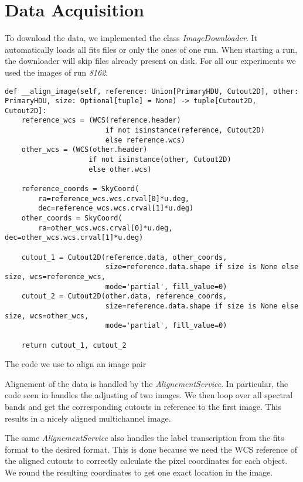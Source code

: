 \section{Data Acquisition}
To download the data, we implemented the class \emph{ImageDownloader}. It automatically loads all fits files or only the ones of one run. When starting a run, the downloader will skip files already present on disk.
For all our experiments we used the images of run \emph{8162}.

\begin{listing}
    \begin{verbatim}
def __align_image(self, reference: Union[PrimaryHDU, Cutout2D], other: PrimaryHDU, size: Optional[tuple] = None) -> tuple[Cutout2D, Cutout2D]:
    reference_wcs = (WCS(reference.header)
                        if not isinstance(reference, Cutout2D)
                        else reference.wcs)
    other_wcs = (WCS(other.header)
                    if not isinstance(other, Cutout2D)
                    else other.wcs)

    reference_coords = SkyCoord(
        ra=reference_wcs.wcs.crval[0]*u.deg,
        dec=reference_wcs.wcs.crval[1]*u.deg)
    other_coords = SkyCoord(
        ra=other_wcs.wcs.crval[0]*u.deg, dec=other_wcs.wcs.crval[1]*u.deg)

    cutout_1 = Cutout2D(reference.data, other_coords,
                        size=reference.data.shape if size is None else size, wcs=reference_wcs,
                        mode='partial', fill_value=0)
    cutout_2 = Cutout2D(other.data, reference_coords,
                        size=reference.data.shape if size is None else size, wcs=other_wcs,
                        mode='partial', fill_value=0)

    return cutout_1, cutout_2
        \end{verbatim}
    \label{alignementCode}
    \caption{The code we use to align an image pair}
\end{listing}

Alignement of the data is handled by the \emph{AlignementService}. In particular, the code seen in  handles the adjusting of two images. We then loop over all spectral bands and get the corresponding cutouts in reference to the first image. This results in a nicely aligned multichannel image.

The same \emph{AlignementService} also handles the label transcription from the fits format to the desired format. This is done because we need the WCS reference of the aligned cutouts to correctly calculate the pixel coordinates for each object.
We round the resulting coordinates to get one exact location in the image.

